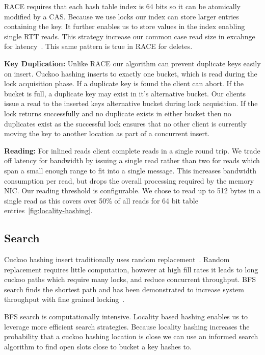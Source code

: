 RACE requires that each hash table index is 64 bits so it
can be atomically modified by a CAS. Because we use locks
our index can store larger entries containing the key. It
further enables us to store values in the index enabling
single RTT reads. This strategy increase our common case
read size in excahnge for latency~.
This same pattern is true in RACE for deletes. 

\textbf{Key Duplication:} Unlike RACE our algorithm can
prevent duplicate keys easily on insert. Cuckoo hashing
inserts to exactly one bucket, which is read during the lock
acquisition phase. If a duplicate key is found the client
can abort. If the bucket is full, a duplicate key may exist
in it's alternative bucket. Our clients issue a read to the
inserted keys alternative bucket during lock acquisition. If
the lock returns successfully and no duplicate exists in
either bucket then no duplicates exist as the successful
lock ensures that no other client is currently moving the
key to another location as part of a concurrent insert.


\textbf{Reading:} For inlined reads client complete reads in
a single round trip. We trade off latency for bandwidth by
issuing a single read rather than two for reads which span a
small enough range to fit into a single message. This
increases bandwidth consumption per read, but drops the
overall processing required by the memory NIC. Our reading
threshold is configurable. We chose to read up to 512 bytes
in a single read as this covers over 50\% of all reads for
64 bit table entries~\ref{fig:locality-hashing}.

\subsection{Search}
Cuckoo hashing insert traditionally uses random
replacement~\cite{cuckoo}. Random replacement requires
little computation, however at high fill rates it leads to
long cuckoo paths which require many locks, and reduce
concurrent throughput. BFS search finds the shortest path
and has been demonstrated to increase system throughput with
fine grained locking~\cite{algorithmic-improvements}.

BFS search is computationally intensive. Locality based
hashing enables us to leverage more efficient search
strategies. Because locality hashing increases the
probability that a cuckoo hashing location is close we can
use an informed search algorithm to find open slots close to
bucket a key hashes to. 

